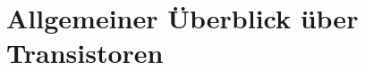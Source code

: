 \section{Allgemeiner Überblick über Transistoren}
\label{cha:allgemeinerueberblickuebertransistoren}

